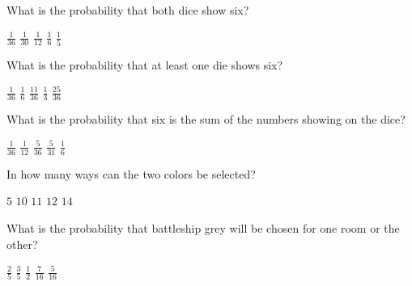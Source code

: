 \documentclass[answers,12pt]{exam}
\begin{document}
\begin{questions}
\question What is the probability that both dice show six?\\
\begin{oneparchoices}
\correctchoice $\frac{1}{36}$
\choice $\frac{1}{30}$ %
\choice $\frac{1}{12}$ %
\choice $\frac{1}{6}$
\choice $\frac{1}{5}$ %
\end{oneparchoices}

\question
What is the probability that at least one die shows six?\\
\begin{oneparchoices}
\choice $\frac{1}{36}$
\choice $\frac{1}{6}$
\correctchoice $\frac{11}{36}$
\choice $\frac{1}{3}$ %
\choice $\frac{25}{36}$ %
\end{oneparchoices}

\question\label{LastDice}
What is the probability that six is the sum of the numbers
showing on the dice?\\
\begin{oneparchoices}
\choice $\frac{1}{36}$
\choice $\frac{1}{12}$ %
\correctchoice $\frac{5}{36}$
\choice $\frac{5}{31}$ %
\choice $\frac{1}{6}$ %
\end{oneparchoices}


\question\label{FirstColor}
In how many ways can the two colors be selected?\\
\begin{oneparchoices}
\choice $5$ %
\correctchoice $10$
\choice $11$ %
\choice $12$ %
\choice $14$ %
\end{oneparchoices}

\question
What is the probability that battleship grey will be chosen
for one room or the other?\\
\begin{oneparchoices}
\choice $\frac{2}{5}$ %
\correctchoice $\frac{3}{5}$
\choice $\frac{1}{2}$ %
\choice $\frac{7}{16}$ %
\choice $\frac{5}{16}$ %
\end{oneparchoices}


\end{questions}
\end{document}
